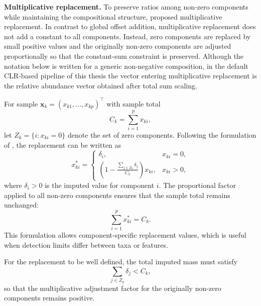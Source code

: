 \noindent\textbf{Multiplicative replacement.}
To preserve ratios among non-zero components while maintaining the compositional structure, \citet{martin-fernandez2003dealing} proposed multiplicative replacement. In contrast to global offset addition, multiplicative replacement does not add a constant to all components. Instead, zero components are replaced by small positive values and the originally non-zero components are adjusted proportionally so that the constant-sum constraint is preserved.
Although the notation below is written for a generic non-negative composition, in the default CLR-based pipeline of this thesis the vector entering multiplicative replacement is the relative abundance vector obtained after total sum scaling.

For sample $\mathbf{x}_k=(x_{k1},\ldots,x_{kp})^\top$ with sample total
\begin{equation}
C_k=\sum_{i=1}^p x_{ki},
\label{eq:2micro:sample_total_multiplicative_replacement}
\end{equation}
let $Z_k=\{i:x_{ki}=0\}$ denote the set of zero components. Following the formulation of \citet{martin-fernandez2003dealing}, the replacement can be written as
\begin{equation}
x_{ki}^\ast =
\begin{cases}
\delta_i, & x_{ki}=0,\\
\left(1-\frac{\sum_{j\in Z_k}\delta_j}{C_k}\right)x_{ki}, & x_{ki}>0,
\end{cases}
\label{eq:2micro:multiplicative_replacement_general}
\end{equation}
where $\delta_i>0$ is the imputed value for component $i$. The proportional factor applied to all non-zero components ensures that the sample total remains unchanged:
\begin{equation}
\sum_{i=1}^p x_{ki}^\ast = C_k.
\label{eq:2micro:multiplicative_replacement_total}
\end{equation}
This formulation allows component-specific replacement values, which is useful when detection limits differ between taxa or features.

For the replacement to be well defined, the total imputed mass must satisfy
\begin{equation}
	\sum_{j\in Z_k}\delta_j < C_k,
\end{equation}
so that the multiplicative adjustment factor for the originally non-zero components remains positive.

